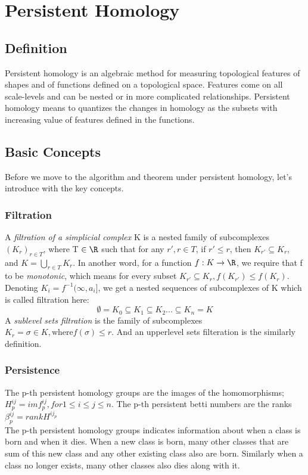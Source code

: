 \section{Persistent Homology}

\subsection{Definition}
Persistent homology is an algebraic method for measuring topological features of shapes and of functions defined on a topological space. Features come on all scale-levels and can be nested or in more complicated relationships. Persistent homology means to quantizes the changes in homology as the subsets with increasing value of features defined in the functions.

\subsection{Basic Concepts}
Before we move to the algorithm and theorem under persistent homology, let's introduce with the key concepts. 

\subsubsection{Filtration} A \textit{filtration of a simplicial complex} K is a nested family of subcomplexes $(K_r)_{r \in T}$, where T $\in \R $ such that for any $r', r \in T$, if $r' \leq r $, then $K_{r'} \subseteq K_r$, and $ K = \bigcup_{r \in T} K_r$. In another word, for a function $ f : K \rightarrow \R $, we require that f to be \textit{monotonic}, which means for every subset $K_{r'} \subseteq K_r, f(K_{r'}) 
\leq f(K_r)$. \\ 
Denoting $K_i = f^{-1}(\infty, a_i]$, we get a nested sequences of subcomplexes of K which is called filtration here:
\begin{equation*}
    \emptyset = K_0 \subseteq K_1 \subseteq K_2 ... \subseteq K_n = K
\end{equation*}
A \textit{sublevel sets filtration} is the family of subcomplexes $K_r = {\sigma \in K, \text{where} f(\sigma) \leq r}$. And an upperlevel sets filteration is the similarly definition. 

\subsubsection{Persistence}
The p-th persistent homology groups are the images of the homomorphisms; $H^{ij}_p = im f^{ij}_p, for 1 \leq i \leq j \leq n.$ The p-th persistent betti numbers are the ranks $\beta^{ij}_p = rank H^{ij_p}$ \cite{persisthmo}\\ 
The p-th persistent homology groups indicates information about when a class is born and when it dies. When a new class is born, many other classes that are sum of this new class and any other existing class also are born. Similarly when a class no longer exists, many other classes also dies along with it.

